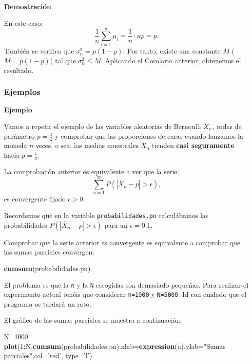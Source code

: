 \documentclass[]{book}
\newenvironment{Shaded}{\begin{snugshade}}{\end{snugshade}}
\newcommand{\DataTypeTok}[1]{\textcolor[rgb]{0.13,0.29,0.53}{#1}}
\newcommand{\DecValTok}[1]{\textcolor[rgb]{0.00,0.00,0.81}{#1}}
\newcommand{\KeywordTok}[1]{\textcolor[rgb]{0.13,0.29,0.53}{\textbf{#1}}}
\newcommand{\NormalTok}[1]{#1}
\newcommand{\OperatorTok}[1]{\textcolor[rgb]{0.81,0.36,0.00}{\textbf{#1}}}
\newcommand{\StringTok}[1]{\textcolor[rgb]{0.31,0.60,0.02}{#1}}
\begin{document}
\textbf{Demostración}

En este caso:
\[
\frac{1}{n}\sum_{i=1}^n \mu_i = \frac{1}{n}\cdot np=p.
\]
También se verifica que \(\sigma_n^2 =p(1-p)\). Por tanto, existe una constante \(M\) (\(M=p(1-p)\)) tal que \(\sigma_n^2\leq M\). Aplicando el Corolario anterior, obtenemos el resultado.

\hypertarget{ejemplos-19}{%
\subsubsection{Ejemplos}\label{ejemplos-19}}

\textbf{Ejemplo}

Vamos a repetir el ejemplo de las variables aleatorias de Bernoulli \(X_n\), todas de parámetro \(p=\frac{1}{2}\) y comprobar que las proporciones de caras cuando lanzamos la moneda \(n\) veces, o sea, las medias muestrales \(\overline{X}_n\) tienden \textbf{casi seguramente} hacia \(p=\frac{1}{2}\).

La comprobación anterior es equivalente a ver que la serie:
\[
\sum_{n=1}^\infty P(|\overline{X}_n-p|>\epsilon),
\]
es convergente fijado \(\epsilon >0\).

Recordemos que en la variable \texttt{probabilidades.pn} calculábamos las probabilidades \(P(|\overline{X}_n-p|>\epsilon)\) para un \(\epsilon =0.1\).

Comprobar que la serie anterior es convergente es equivalente a comprobar que las sumas parciales convergen:

\begin{Shaded}
\begin{Highlighting}[]
\KeywordTok{cumsum}\NormalTok{(probabilidades.pn)}
\end{Highlighting}
\end{Shaded}

El problema es que la \texttt{n} y la \texttt{N} escogidas son demasiado pequeñas. Para realizar el experimento actual tenéis que considerar \texttt{n=1000} y \texttt{N=5000}. Id con cuidado que el programa os tardará un rato.

El gráfico de las sumas parciales se muestra a continuación:

\begin{Shaded}
\begin{Highlighting}[]
\NormalTok{N=}\DecValTok{1000}
\KeywordTok{plot}\NormalTok{(}\DecValTok{1}\OperatorTok{:}\NormalTok{N,}\KeywordTok{cumsum}\NormalTok{(probabilidades.pn),}\DataTypeTok{xlab=}\KeywordTok{expression}\NormalTok{(n),}\DataTypeTok{ylab=}\StringTok{"Sumas parciales"}\NormalTok{,}\DataTypeTok{col=}\StringTok{'red'}\NormalTok{, }\DataTypeTok{type=}\StringTok{'l'}\NormalTok{)}
\end{Highlighting}
\end{Shaded}
\end{document}
